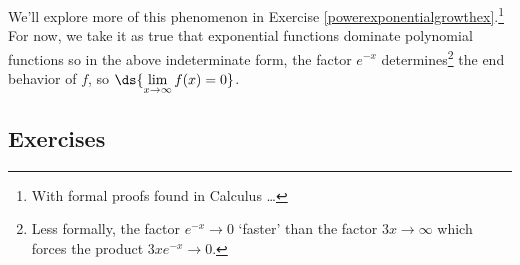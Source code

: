 \documentclass{ximera}
\begin{document}
\medskip

We'll explore more of this phenomenon in Exercise \ref{powerexponentialgrowthex}.\footnote{With formal proofs found in Calculus \ldots} For now, we take it as true that exponential functions dominate polynomial functions so in the above indeterminate form,  the factor $e^{-x}$ determines\footnote{Less formally, the factor $e^{-x} \rightarrow 0$ `faster' than the factor $3x \rightarrow \infty$ which forces the product $3x e^{-x} \rightarrow 0$.} the end behavior of $f$, so $\ds{\lim_{x \rightarrow \infty} f(x) = 0}$.

\newpage

\subsection{Exercises}


\closegraphsfile
\end{document}
